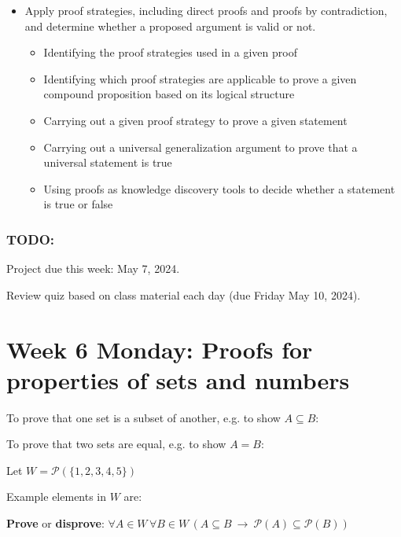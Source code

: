 \documentclass[12pt, oneside]{article}
\begin{document}
\begin{itemize}
\item Apply proof strategies, including direct proofs and proofs by contradiction, and determine whether a proposed argument is valid or not.
\begin{itemize}
    \item Identifying the proof strategies used in a given proof
    \item Identifying which proof strategies are applicable to prove a given compound proposition based on its logical structure
    \item Carrying out a given proof strategy to prove a given statement
    \item Carrying out a universal generalization argument to prove that a universal statement is true
    \item Using proofs as knowledge discovery tools to decide whether a statement is true or false
\end{itemize}
\end{itemize}

\subsubsection*{TODO:}
\begin{list}
   {\itemsep2pt}
   \item Project due this week: May 7, 2024. 
   \item Review quiz based on class material each day (due Friday May 10, 2024).
\end{list}

\newpage

\section*{Week 6 Monday: Proofs for properties of sets and numbers}


To prove that one set is a subset of another, e.g. to show $A \subseteq B$:

\vspace{50pt}

To prove that two sets are equal, e.g. to show $A = B$:

\vspace{50pt}
 

Let $W =  \mathcal{P}(  \{ 1,2,3,4,5\} )$

Example elements in $W$ are:
\vspace{20pt}


{\bf Prove} or {\bf  disprove}:  $\forall  A \in W\,  \forall B \in W\,  \left( A \subseteq B
~\to ~ \mathcal{P}(A) \subseteq \mathcal{P}(B) \right)$
\end{document}

